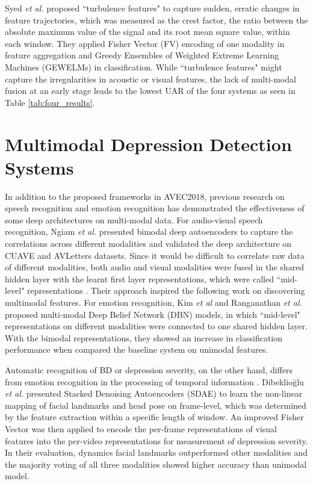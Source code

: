 Syed \textit{et al.} \cite{syed2018} proposed ``turbulence features" to capture sudden, erratic changes in feature trajectories, which was measured as the crest factor, the ratio between the absolute maximum value of the signal and its root mean square value, within each window. They applied Fisher Vector (FV) encoding of one modality in feature aggregation and Greedy Ensembles of Weighted Extreme Learning Machines (GEWELMs) in classification. While ``turbulence features" might capture the irregularities in acoustic or visual features, the lack of multi-modal fusion at an early stage leads to the lowest UAR of the four systems as seen in Table \ref{tab:four_results}.




\section{Multimodal Depression Detection Systems}

In addition to the proposed frameworks in AVEC2018, previous research on speech recognition and emotion recognition has demonstrated the effectiveness of some deep architectures on multi-modal data. For audio-visual speech recognition, Ngiam \textit{et al.} \cite{ngiam2011} presented bimodal deep autoencoders to capture the correlations across different modalities and validated the deep architecture on CUAVE and AVLetters datasets. Since it would be difficult to correlate raw data of different modalities, both audio and visual modalities were fused in the shared hidden layer with the learnt first layer representations, which were called ``mid-level" representations \cite{ngiam2011}. Their approach inspired the following work on discovering multimodal features. For emotion recognition, Kim \textit{et al} \cite{kim2013} and Ranganathan \textit{et al.} \cite{ranganathan2016} proposed multi-modal Deep Belief Network (DBN) models, in which ``mid-level" representations on different modalities were connected to one shared hidden layer. With the bimodal representations, they showed an increase in classification performance when compared the baseline system on unimodal features.

Automatic recognition of BD or depression severity, on the other hand, differs from emotion recognition in the processing of temporal information \cite{picard2000, yacoob1994, zacharatos2014}. Dibeklio{\u{g}}lu \textit{et al.} \cite{dibekliouglu2017} presented Stacked Denoising Autoencoders (SDAE) to learn the non-linear mapping of facial landmarks and head pose on frame-level, which was determined by the feature extraction within a specific length of window. An improved Fisher Vector \cite{perronnin2010} was then applied to encode the per-frame representations of visual features into the per-video representations for measurement of depression severity. In their evaluation, dynamics facial landmarks outperformed other modalities and the majority voting \cite{kuncheva2002} of all three modalities showed higher accuracy than unimodal model. 
